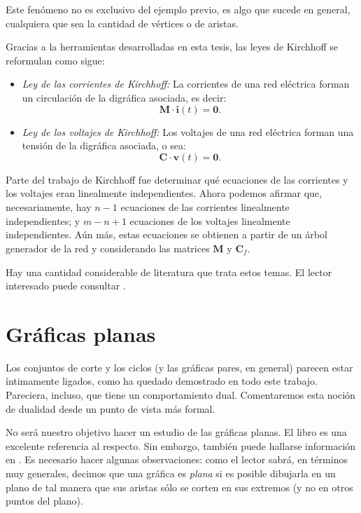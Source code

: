 Este fenómeno no es exclusivo del ejemplo previo, es algo que sucede en general, cualquiera que sea la cantidad de vértices o de aristas.

Gracias a la herramientas desarrolladas en esta tesis, las leyes de Kirchhoff se reformulan como sigue:

\begin{itemize}
    \item \textit{Ley de las corrientes de Kirchhoff:} La corrientes de una red eléctrica forman un circulación de la digráfica asociada, es decir: $$
    \mathbf{M}\cdot\mathbf{i}(t) = \mathbf{0}.$$
    
    \item \textit{Ley de los voltajes de Kirchhoff:} Los voltajes de una red eléctrica forman una tensión de la digráfica asociada, o sea: $$
    \mathbf{C}\cdot\mathbf{v}(t) = \mathbf{0}.$$
\end{itemize}


Parte del trabajo de Kirchhoff fue determinar qué ecuaciones de las corrientes y los voltajes eran linealmente independientes. Ahora podemos afirmar que, necesariamente, hay $n-1$ ecuaciones de las corrientes linealmente independientes; y $m -n +1$ ecuaciones de los voltajes linealmente independientes. Aún más, estas ecuaciones se obtienen a partir de un árbol generador de la red y considerando las matrices $\widehat{\mathbf{M}}$ y $\mathbf{C}_{f}$. 

Hay una cantidad considerable de literatura que trata estos temas. El lector interesado puede consultar \cite{Deo,Seshu,Slepian,Chen}.

\section{Gráficas planas}

Los conjuntos de corte y los ciclos (y las gráficas pares, en general) parecen estar íntimamente ligados, como ha quedado demostrado en todo este trabajo. Pareciera, incluso, que tiene un comportamiento dual. Comentaremos esta noción de dualidad desde un punto de vista más formal.

No será nuestro objetivo hacer un estudio de las gráficas planas. El libro \cite{Bondy} es una excelente referencia al respecto. Sin embargo, también puede hallarse información en \cite{Chen,Deo,Diestel,Seshu,Gross}. Es necesario hacer algunas observaciones: como el lector sabrá, en términos muy generales, decimos que una gráfica es \textit{plana} si es posible dibujarla en un plano de tal manera que sus aristas sólo se corten en sus extremos (y no en otros puntos del plano).

